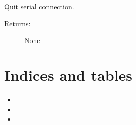 \documentclass[letterpaper,10pt,english]{sphinxmanual}
\begin{document}
\begin{fulllineitems}
\begin{fulllineitems}
\end{fulllineitems}


\begin{fulllineitems}
\label{\detokenize{QConnectionLibrary:QConnectionLibrary.serialclient.serial_base.SerialSocket.quit}}
\sphinxAtStartPar
Quit serial connection.
\begin{description}
\item[{Returns:}] \leavevmode
\sphinxAtStartPar
None

\end{description}

\end{fulllineitems}


\end{fulllineitems}



\chapter{Indices and tables}
\label{\detokenize{index:indices-and-tables}}\begin{itemize}
\item {} 
\sphinxAtStartPar
{}

\item {} 
\sphinxAtStartPar
{}

\item {} 
\sphinxAtStartPar
{}

\end{itemize}
\end{document}
